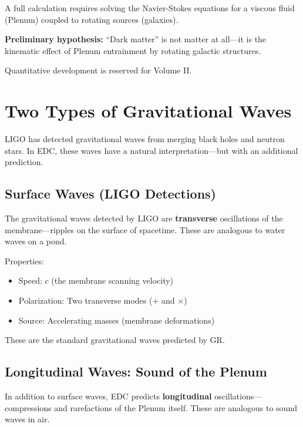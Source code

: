 \begin{tcolorbox}[colback=blue!5,colframe=blue!50!black,title=Future Work: Dark Matter as Plenum Dynamics]
A full calculation requires solving the Navier-Stokes equations for a viscous fluid (Plenum) coupled to rotating sources (galaxies).

\textbf{Preliminary hypothesis:} ``Dark matter'' is not matter at all---it is the kinematic effect of Plenum entrainment by rotating galactic structures.

Quantitative development is reserved for Volume II.
\end{tcolorbox}


\section{Two Types of Gravitational Waves}
\label{sec:gw_types}

LIGO has detected gravitational waves from merging black holes and neutron stars. In EDC, these waves have a natural interpretation---but with an additional prediction.

\subsection{Surface Waves (LIGO Detections)}

The gravitational waves detected by LIGO are \textbf{transverse} oscillations of the membrane---ripples on the surface of spacetime. These are analogous to water waves on a pond.

Properties:
\begin{itemize}
    \item Speed: $c$ (the membrane scanning velocity)
    \item Polarization: Two transverse modes ($+$ and $\times$)
    \item Source: Accelerating masses (membrane deformations)
\end{itemize}

These are the standard gravitational waves predicted by GR.

\subsection{Longitudinal Waves: Sound of the Plenum}

In addition to surface waves, EDC predicts \textbf{longitudinal} oscillations---compressions and rarefactions of the Plenum itself. These are analogous to sound waves in air.

